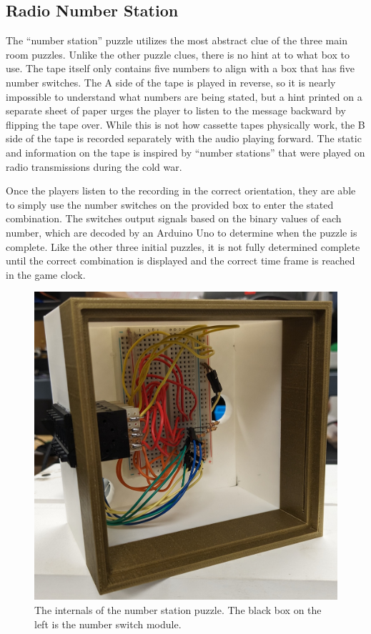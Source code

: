 \documentclass[conference]{IEEEtran}
\begin{document}
\subsection{Radio Number Station}
The ``number station'' puzzle utilizes the most abstract clue of the three main room puzzles. Unlike the other puzzle clues, 
there is no hint at to what box to use. The tape itself only contains five numbers to align with a box that has five number 
switches. The A side of the tape is played in reverse, so it is nearly impossible to understand what numbers are being stated, 
but a hint printed on a separate sheet of paper urges the player to listen to the message backward by flipping the tape over. 
While this is not how cassette tapes physically work, the B side of the tape is recorded separately with the audio playing 
forward. The static and information on the tape is inspired by “number stations” that were played on radio transmissions during 
the cold war. 

\indent Once the players listen to the recording in the correct orientation, they are able to simply use the number 
switches on the provided box to enter the stated combination. The switches output signals based on the binary values 
of each number, which are decoded by an Arduino Uno to determine when the puzzle is complete. Like the other three initial 
puzzles, it is not fully determined complete until the correct combination is displayed and the correct time frame is reached 
in the game clock.

\begin{figure}[ht]
    \centering
    \includegraphics[width=0.90\columnwidth]{Images/num_puzzle.jpg}
    \caption{The internals of the number station puzzle. The black box on the left is the number switch module.}
\end{figure}
\end{document}
